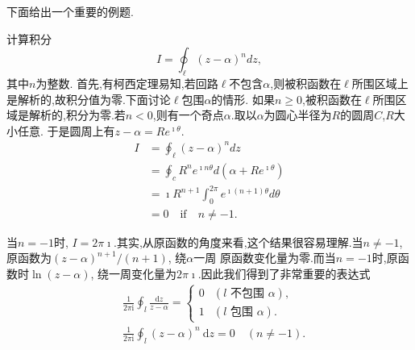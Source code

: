 下面给出一个重要的例题.
\begin{examplebox}{计算积分\[ I = \oint_\ell (z-\alpha)^n dz, \]其中$n$为整数.}
首先,有柯西定理易知,若回路$\ell$不包含$\alpha$,则被积函数在$\ell$所围区域上是解析的,故积分值为零.下面讨论$\ell$包围$\alpha$的情形.
如果$n\geq 0$,被积函数在$\ell$所围区域是解析的,积分为零.若$n<0$,则有一个奇点$\alpha$.取以$\alpha$为圆心半径为$R$的圆周$C$,$R$大小任意.
于是圆周上有$z-\alpha = Re^{\imath \theta}$.
$$
\begin{aligned}
    I &= \oint_\ell (z-\alpha)^n dz\\
     &= \oint_c R^n e^{\imath n \theta} d (\alpha + R e^{\imath \theta})\\
     & =  \imath R^{n+1} \int_0^{2\pi} e^{\imath (n+1)\theta}  d\theta \\
     & = 0 \quad \textrm{if} \quad n\neq -1.
\end{aligned}
$$

当$n = -1$时, $I = 2\pi \imath$.其实,从原函数的角度来看,这个结果很容易理解.当$n\neq -1$,原函数为$(z-\alpha)^{n+1}/(n+1)$, 绕$\alpha$一周
原函数变化量为零.而当$n=-1$时,原函数时$\ln(z-\alpha)$, 绕一周变化量为$2\pi \imath$.因此我们得到了非常重要的表达式
$$
    \begin{aligned}
        & \frac{1}{2 \pi \mathrm{i}} \oint_l \frac{\mathrm{d} z}{z-\alpha}= \begin{cases}0 & (l \text { 不包围 } \alpha), \\
        1 & (l \text { 包围 } \alpha) . \end{cases} \\
        & \frac{1}{2 \pi \mathrm{i}} \oint_l(z-\alpha)^n \mathrm{~d} z=0 \quad(n \neq-1) .
        \end{aligned}
$$
\end{examplebox}